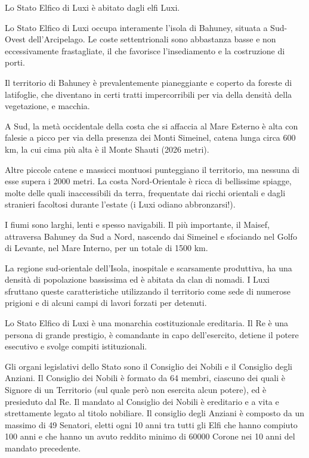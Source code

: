 Lo Stato Elfico di Luxi \`e abitato dagli elfi Luxi.

\Geografia Lo Stato Elfico di Luxi occupa interamente l'isola di Bahuney, situata
a Sud-Ovest dell'Arcipelago. Le coste settentrionali sono abbastanza
basse e non eccessivamente frastagliate, il che favorisce
l'insediamento e la costruzione di porti.

Il territorio di Bahuney \`e prevalentemente pianeggiante e coperto da
foreste di latifoglie, che diventano in certi tratti impercorribili per
via della densit\`a della vegetazione, e macchia.

 A Sud, la met\`a occidentale della costa che si affaccia
al Mare Esterno \`e alta con falesie a picco per via della presenza dei Monti
Simeinel, catena lunga circa 600 km, la cui cima pi\`u alta \`e il Monte
Shauti (2026 metri).

Altre piccole catene e massicci montuosi punteggiano il territorio, ma
nessuna di esse supera i 2000 metri. La costa Nord-Orientale \`e
ricca di bellissime spiagge, molte delle quali inaccessibili da terra,
frequentate dai ricchi orientali e dagli stranieri facoltosi durante
l'estate (i Luxi odiano abbronzarsi!).

I fiumi sono larghi, lenti e spesso navigabili. Il pi\`u
importante, il Maisef, attraversa Bahuney da Sud a Nord, nascendo dai
Simeinel e sfociando nel Golfo di Levante, nel Mare Interno, per un
totale di 1500 km.

La regione sud-orientale dell'Isola, inospitale e scarsamente
produttiva, ha una densit\`a di popolazione bassissima ed \`e abitata
da clan di nomadi. I Luxi sfruttano queste caratteristiche utilizzando
il territorio come sede di numerose prigioni e di alcuni campi di
lavori forzati per detenuti.

\Politica Lo Stato Elfico di Luxi \`e una monarchia costituzionale
ereditaria.  Il Re \`e una persona di grande prestigio, \`e comandante
in capo dell'esercito, detiene il potere esecutivo e svolge compiti
istituzionali.

Gli organi legislativi dello Stato sono il Consiglio dei Nobili e il
Consiglio degli Anziani. Il Consiglio dei Nobili \`e formato da 64
membri, ciascuno dei quali \`e Signore di un Territorio (sul quale
per\`o non esercita alcun potere), ed \`e presieduto dal Re. Il
mandato al Consiglio dei Nobili \`e ereditario e a vita e
strettamente legato al titolo nobiliare. Il consiglio degli Anziani
\`e composto da un massimo di 49 Senatori, eletti ogni 10 anni tra
tutti gli Elfi che hanno compiuto 100 anni e che hanno un avuto
reddito minimo di 60000 Corone nei 10 anni del mandato precedente.

